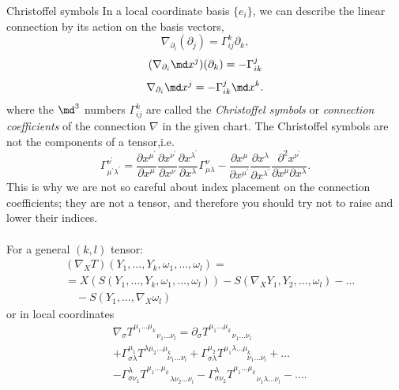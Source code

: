 \begin{mybox}{Christoffel symbols}
	In a local coordinate basis $\{e_i\}$, we can describe the linear connection by its action on the basis vectors,
	\begin{equation}
		\nabla_{\partial_i} (\partial_j) = \Gamma^k_{ij} \partial_k,
	\end{equation}
	\begin{equation}
		(\nabla_{\partial_i} \md x^j)(\partial_k) = - \Gamma^j_{ik}
	\end{equation}
	\begin{equation}
		\nabla_{\partial_i} \md x^j = - \Gamma^j_{ik} \md x^k.
	\end{equation}
	where the $\md^3$ numbers $\Gamma^k_{ij}$ are called the \emph{Christoffel symbols} or \emph{connection coefficients} of the connection $\nabla$ in the given chart. The Christoffel symbols are not the components of a tensor,i.e.
	\begin{equation}
	\label{eq:christoffelTrafo}
		\Gamma^{\nu^\prime}_{\mu^\prime \lambda^\prime} = \frac{\partial x^{\mu^\prime}}{\partial x^{\mu}} \frac{\partial x^{\nu^\prime}}{\partial x^{\nu}} \frac{\partial x^{\lambda^\prime}}{\partial x^\lambda} \Gamma^{\nu}_{\mu \lambda} - \frac{\partial x^\mu}{\partial x^{\mu^\prime}}\frac{\partial x^\lambda}{\partial x^{\lambda^\prime}} \frac{\partial^2 x^{\nu^\prime}}{\partial x^\mu \partial x^\lambda}.
	\end{equation} 
	This is why we are not so careful about index placement on the
	connection coefficients; they are not a tensor, and therefore you should try not to raise and
	lower their indices.
	\\
	\\
	For a general $(k,l)$ tensor:
	\begin{align}
		&(\nabla_X T)(Y_1,\dots,Y_k,\omega_1,\dots,\omega_l)=\\
		&=X(S(Y_1,\dots,Y_k,\omega_1,\dots,\omega_l)) - S(\nabla_XY_1,Y_2,\dots,\omega_l) - \dots \nonumber \\
		& \quad - S(Y_1,\dots,\nabla_X\omega_l)
	\end{align}
or in local coordinates
	\begin{align}
		& \nabla_\sigma T^{\mu_1 \dots \mu_k}_{\quad \quad \quad \nu_1 \dots \nu_l} = \partial_\sigma T^{\mu_1 \dots \mu_k}_{\quad \quad \quad \nu_1 \dots \nu_l} \\
		& +\Gamma^{\mu_1}_{\sigma \lambda} T^{\lambda \mu_2 \dots \mu_k}_{\quad \quad \quad \nu_1 \dots \nu_l} + \Gamma^{\mu_2}_{\sigma \lambda} T^{\mu_1\lambda \dots \mu_k}_{\quad \quad \quad \nu_1 \dots \nu_l} + \dots \nonumber \\
		&- \Gamma^\lambda_{\sigma \nu_1} T^{\mu_1 \dots \mu_k}_{\quad \quad \quad \lambda \nu_2 \dots \nu_l}-\Gamma^\lambda_{\sigma \nu_2} T^{\mu_1 \dots \mu_k}_{\quad \quad \quad \nu_1 \lambda \dots \nu_l} - \dots \nonumber.
	\end{align}
\end{mybox}
